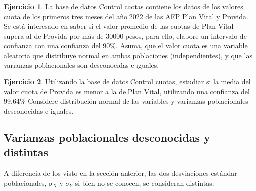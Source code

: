 \documentclass[
  11pt,
]{book}
\theoremstyle{definition}
\theoremstyle{definition}
\theoremstyle{definition}
\newtheorem{exercise}{Ejercicio}[chapter]
\theoremstyle{definition}
\theoremstyle{remark}
\begin{document}
\begin{exercise}
\protect\hypertarget{exr:ICcontrolcuotas}{}\label{exr:ICcontrolcuotas}La base de datos \hyperref[Cuotas]{Control cuotas} contiene los datos de los valores cuota de los primeros tres meses del año 2022 de las AFP Plan Vital y Provida. Se está interesado en saber si el valor promedio de las cuotas de Plan Vital supera al de Provida por más de 30000 pesos, para ello, elabore un intervalo de confianza con una confianza del 90\%. Asuma, que el valor cuota es una variable aleatoria que distribuye normal en ambas poblaciones (independientes), y que las varianzas poblacionales son desconocidas e iguales.
\end{exercise}

\begin{exercise}
Utilizando la base de datos \hyperref[Cuotas]{Control cuotas}, estudiar si la media del valor cuota de Provida es menor a la de Plan Vital, utilizando una confianza del 99.64\% Considere distribución normal de las variables y varianzas poblacionales desconocidas e iguales.
\end{exercise}

\subsection{Varianzas poblacionales desconocidas y distintas}\label{intervalo-de-confianza-para-la-diferencia-de-medias-varianzas-desconocidas-distintas}

A diferencia de los visto en la sección anterior, las dos desviaciones estándar poblacionales, \(\sigma_X\) y \(\sigma_Y\) si bien no se conocen, se consideran distintas.

\begin{table}[H]
\centering
\caption{\label{tab:unnamed-chunk-12}Intervalos de confianza para la diferencia de medias de dos distribucones normales y varianzas poblacionales desconocidas y distintas}
\centering
{}
\end{table}
\end{document}
